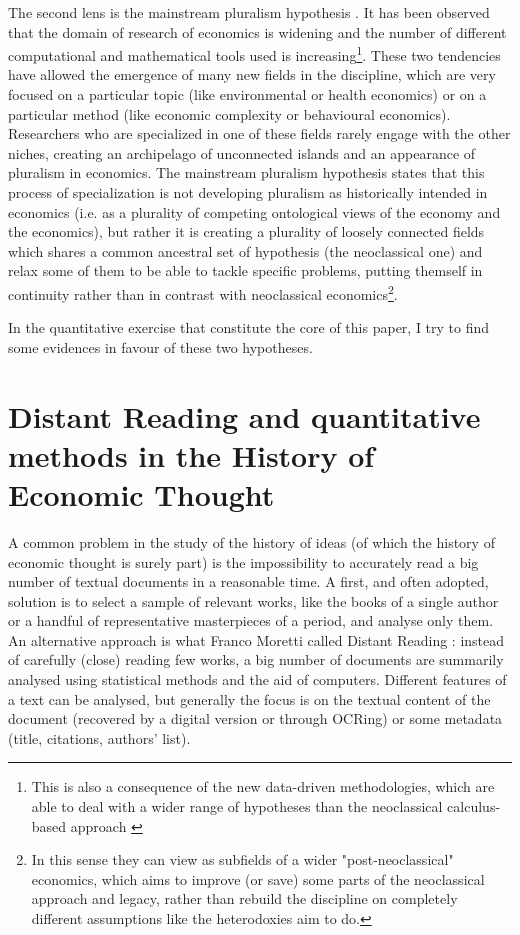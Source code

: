 \documentclass[a4paper, 11pt, headings=standardclasses, tablecaptionsbelow]{scrartcl}
\begin{document}
The second lens is the mainstream pluralism hypothesis \parencite{davis2006,davis2019a,davis2019b,cedrini2018}. It has been observed that the domain of research of economics is widening and the number of different computational and mathematical tools used is increasing\footnote{This is also a consequence of the new data-driven methodologies, which are able to deal with a wider range of hypotheses than the neoclassical calculus-based approach \Parencite[see][]{cherrier2022}}. These two tendencies have allowed the emergence of many new fields in the discipline, which are very focused on a particular topic (like environmental or health economics) or on a particular method (like economic complexity or behavioural economics).
Researchers who are specialized in one of these fields rarely engage with the other niches, creating an archipelago of unconnected islands and an appearance of pluralism in economics.
The mainstream pluralism hypothesis states that this process of specialization is not developing pluralism as historically intended in economics (i.e. as a plurality of competing ontological views of the economy and the economics), but rather it is creating a plurality of loosely connected fields which shares a common ancestral set of hypothesis (the neoclassical one) and relax some of them to be able to tackle specific problems, putting themself in continuity rather than in contrast with neoclassical economics\footnote{In this sense they can view as subfields of a wider "post-neoclassical" economics, which aims to improve (or save) some parts of the neoclassical approach and legacy, rather than rebuild the discipline on completely different assumptions like the heterodoxies aim to do.}.

In the quantitative exercise that constitute the core of this paper, I try to find some evidences in favour of these two hypotheses.

\section{Distant Reading and quantitative methods in the History of Economic Thought}
A common problem in the study of the history of ideas (of which the history of economic thought is surely part) is the impossibility to accurately read a big number of textual documents in a reasonable time. A first, and often adopted, solution is to select a sample of relevant works, like the books of a single author or a handful of representative masterpieces of a period, and analyse only them.
An alternative approach is what Franco Moretti called Distant Reading \parencite{moretti2013}: instead of carefully (close) reading few works, a big number of documents are summarily analysed using statistical methods and the aid of computers.
Different features of a text can be analysed, but generally the focus is on the textual content of the document (recovered by a digital version or through OCRing) or some metadata (title, citations, authors' list).
\end{document}

